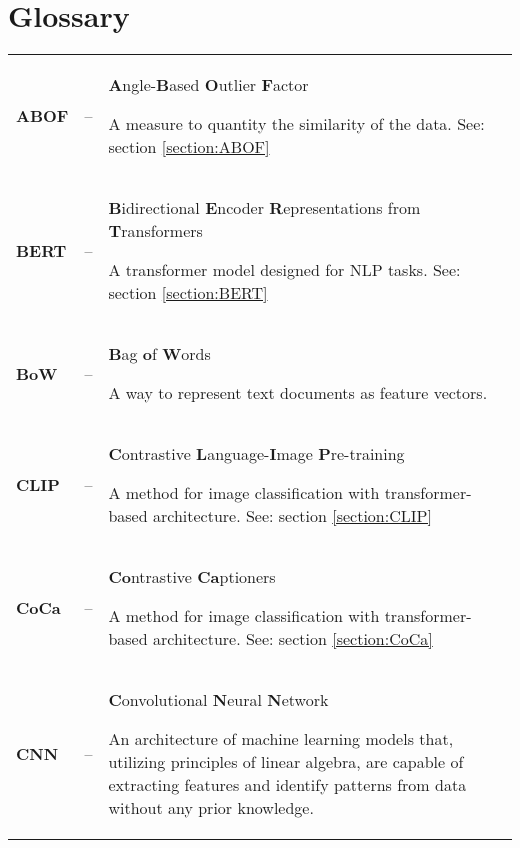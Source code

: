 \chapter{Glossary}
\label{chapter:glossary}

{%
    \noindent
    \renewcommand{\arraystretch}{1.5}
    \begin{longtable}{>{\bfseries}l l p{}}
        ABOF
        &–&
        \textbf{A}ngle-\textbf{B}ased \textbf{O}utlier \textbf{F}actor
        \par
        \small
        A measure to quantity the similarity of the data.
        \newline
        See: section \ref{section:ABOF}
        \\

        BERT
        &–&
        \textbf{B}idirectional \textbf{E}ncoder \textbf{R}epresentations from \textbf{T}ransformers
        \par
        \small
        A transformer model designed for NLP tasks.
        \newline
        See: section \ref{section:BERT}
        \\

        BoW
        &–&
        \textbf{B}ag \textbf{o}f \textbf{W}ords
        \par
        \small
        A way to represent text documents as feature vectors.
        \\

        CLIP
        &–&
        \textbf{C}ontrastive \textbf{L}anguage-\textbf{I}mage \textbf{P}re-training
        \par
        \small
        A method for image classification with transformer-based architecture.
        \newline
        See: section \ref{section:CLIP}
        \\

        CoCa
        &–&
        \textbf{Co}ntrastive \textbf{Ca}ptioners
        \par
        \small
        A method for image classification with transformer-based architecture.
        \newline
        See: section \ref{section:CoCa}
        \\

        CNN
        &–&
        \textbf{C}onvolutional \textbf{N}eural \textbf{N}etwork
        \par
        \small
        An architecture of machine learning models that, utilizing principles of linear algebra,
        are capable of extracting features and identify patterns from data without any prior knowledge.
        \\


\end{longtable}}
